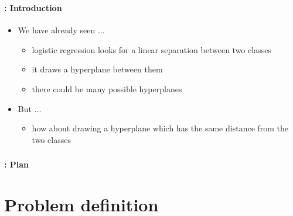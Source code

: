 \documentclass[xcolor=table]{beamer}
\subtitle[SVM]{Support vector machine (SVM)}
\begin{document}
	
\begin{frame}
	\frametitle{\inserttitle}
	\framesubtitle{\insertshortsubtitle: Introduction}
	
	\begin{itemize}
		\item We have already seen ...
		\begin{itemize}
			\item logistic regression looks for a linear separation between two classes
			\item it draws a hyperplane between them
			\item there could be many possible hyperplanes
		\end{itemize}
		\item But ...
		\begin{itemize}
			\item how about drawing a hyperplane which has the same distance from the two classes
		\end{itemize}

	\end{itemize}
\end{frame}


\begin{frame}
	\frametitle{\inserttitle}
	\framesubtitle{\insertshortsubtitle: Plan}
	
	\begin{multicols}{2}
		\tableofcontents
	\end{multicols}
\end{frame}

\section{Problem definition}
\end{document}
